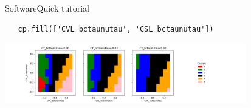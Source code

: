 \begin{frame}[fragile, t]{Software}{Quick tutorial}
\vspace{0.75cm}
\begin{verbatim}
   cp.fill(['CVL_bctaunutau', 'CSL_bctaunutau'])
\end{verbatim}
\centering
\includegraphics[trim=3cm 0 11cm 0, clip, width=10.5cm]{figures/plots/2dfill.pdf}
\end{frame}
